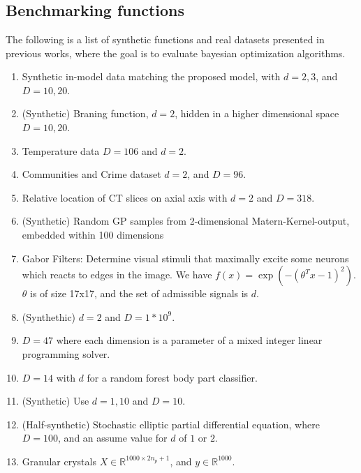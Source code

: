 \chapter{}

\section{Benchmarking functions}

The following is a list of synthetic functions and real datasets presented in previous works, where the goal is to evaluate bayesian optimization algorithms. 

\begin{enumerate}
\item \citep{Garnett2013} Synthetic in-model data matching the proposed model, with $d=2, 3$, and $D=10, 20$.
\item \citep{Garnett2013} (Synthetic) Braning function, $d=2$, hidden in a higher dimensional space $D=10, 20$.
\item \citep{Garnett2013} Temperature data $D=106$ and $d=2$.
\item \citep{Garnett2013} Communities and Crime dataset $d=2$, and $D=96$. 
\item \citep{Garnett2013} Relative location of CT slices on axial axis with $d = 2$ and $D=318$. 
\item \citep{Djolonga2013} (Synthetic) Random GP samples from 2-dimensional Matern-Kernel-output, embedded within 100 dimensions
\item \citep{Djolonga2013} Gabor Filters: Determine visual stimuli that maximally excite some neurons which reacts to edges in the image.
We have $f(x) = \exp( -( \theta^T x - 1 )^2 )$. $\theta$ is of size 17x17, and the set of admissible signals is $d$.
\item \citep{Wang2013} (Synthethic) $d=2$ and $D=1*10^9$.
\item \citep{Wang2013} $D=47$ where each dimension is a parameter of a mixed integer linear programming solver.
\item \citep{Wang2013} $D=14$ with $d$ for a random forest body part classifier.
\item \citep{Tripathy}  (Synthetic) Use $d=1,10$ and $D=10$.
\item \citep{Tripathy} (Half-synthetic) Stochastic elliptic partial differential equation, where $D=100$, and an assume value for $d$ of $1$ or $2$.
\item \citep{Tripathy} Granular crystals $X \in \mathbb{R}^{1000 \times 2n_p +1}$, and $y \in \mathbb{R}^{1000}$.

\end{enumerate}
